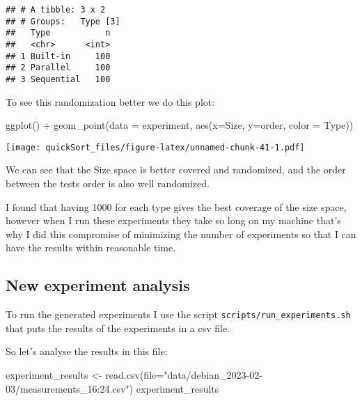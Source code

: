 \documentclass[
]{article}
\newenvironment{Shaded}{\begin{snugshade}}{\end{snugshade}}
\newcommand{\AttributeTok}[1]{\textcolor[rgb]{0.77,0.63,0.00}{#1}}
\newcommand{\FunctionTok}[1]{\textcolor[rgb]{0.00,0.00,0.00}{#1}}
\newcommand{\NormalTok}[1]{#1}
\newcommand{\OtherTok}[1]{\textcolor[rgb]{0.56,0.35,0.01}{#1}}
\newcommand{\SpecialCharTok}[1]{\textcolor[rgb]{0.00,0.00,0.00}{#1}}
\newcommand{\StringTok}[1]{\textcolor[rgb]{0.31,0.60,0.02}{#1}}
\begin{document}
\begin{verbatim}
## # A tibble: 3 x 2
## # Groups:   Type [3]
##   Type           n
##   <chr>      <int>
## 1 Built-in     100
## 2 Parallel     100
## 3 Sequential   100
\end{verbatim}

To see this randomization better we do this plot:

\begin{Shaded}
\end{Shaded}

\begin{Shaded}
\begin{Highlighting}[]
\FunctionTok{ggplot}\NormalTok{() }\SpecialCharTok{+}               
  \FunctionTok{geom\_point}\NormalTok{(}\AttributeTok{data =}\NormalTok{ experiment, }\FunctionTok{aes}\NormalTok{(}\AttributeTok{x=}\NormalTok{Size, }\AttributeTok{y=}\NormalTok{order, }\AttributeTok{color =}\NormalTok{ Type))}
\end{Highlighting}
\end{Shaded}

\texttt{[image: quickSort\_files/figure-latex/unnamed-chunk-41-1.pdf]}

We can see that the Size space is better covered and randomized, and the
order between the tests order is also well randomized.

I found that having 1000 for each type gives the best coverage of the
size space, however when I run these experiments they take so long on my
machine that's why I did this compromise of minimizing the number of
experiments so that I can have the results within reasonable time.

\hypertarget{new-experiment-analysis}{%
\subsection{New experiment analysis}\label{new-experiment-analysis}}

To run the generated experiments I use the script
\texttt{scripts/run\_experiments.sh} that puts the results of the
experiments in a csv file.

So let's analyse the results in this file:

\begin{Shaded}
\begin{Highlighting}[]
\NormalTok{experiment\_results }\OtherTok{\textless{}{-}} \FunctionTok{read.csv}\NormalTok{(}\AttributeTok{file=}\StringTok{"data/debian\_2023{-}02{-}03/measurements\_16:24.csv"}\NormalTok{)}
\NormalTok{experiment\_results}
\end{Highlighting}
\end{Shaded}
\end{document}
